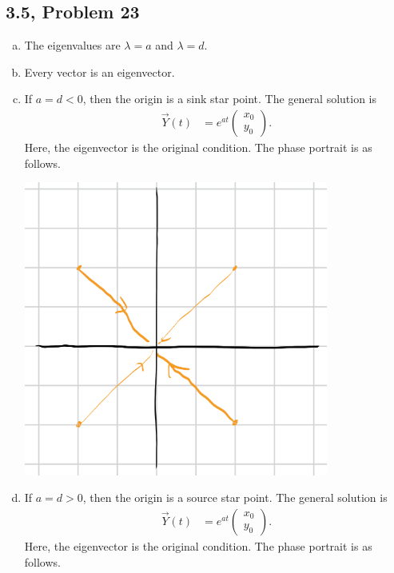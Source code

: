 \documentclass[10pt]{mypackage}
\begin{document}
\subsection{3.5, Problem 23}%
\begin{enumerate}[(a)]
  \item The eigenvalues are $\lambda = a$ and $\lambda = d$.
  \item Every vector is an eigenvector.
  \item If $a = d < 0$, then the origin is a sink star point. The general solution is
    \begin{align*}
      \vec{Y}(t) &= e^{at} \begin{pmatrix}x_0\\y_0\end{pmatrix}.
    \end{align*}
    Here, the eigenvector is the original condition. The phase portrait is as follows.
    \begin{center}
      \includegraphics[width=10cm]{images/3_5_23c.png}
    \end{center}
  \item If $a = d > 0$, then the origin is a source star point. The general solution is
    \begin{align*}
      \vec{Y}(t) &= e^{at} \begin{pmatrix}x_0\\y_0\end{pmatrix}.
    \end{align*}
    Here, the eigenvector is the original condition. The phase portrait is as follows.
    \begin{center}

\end{center}
\end{enumerate}
\end{document}
